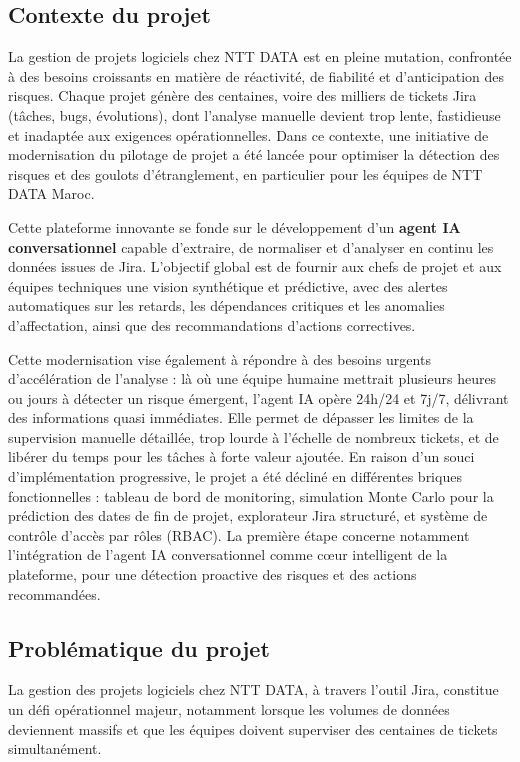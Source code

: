 \subsection{Contexte du projet}

La gestion de projets logiciels chez NTT DATA est en pleine mutation, confrontée à des besoins croissants en matière de réactivité, de fiabilité et d’anticipation des risques. Chaque projet génère des centaines, voire des milliers de tickets Jira (tâches, bugs, évolutions), dont l’analyse manuelle devient trop lente, fastidieuse et inadaptée aux exigences opérationnelles. Dans ce contexte, une initiative de modernisation du pilotage de projet a été lancée pour optimiser la détection des risques et des goulots d’étranglement, en particulier pour les équipes de NTT DATA Maroc.

Cette plateforme innovante se fonde sur le développement d’un \textbf{agent IA conversationnel} capable d’extraire, de normaliser et d’analyser en continu les données issues de Jira. L’objectif global est de fournir aux chefs de projet et aux équipes techniques une vision synthétique et prédictive, avec des alertes automatiques sur les retards, les dépendances critiques et les anomalies d’affectation, ainsi que des recommandations d’actions correctives.

Cette modernisation vise également à répondre à des besoins urgents d’accélération de l’analyse : là où une équipe humaine mettrait plusieurs heures ou jours à détecter un risque émergent, l’agent IA opère 24h/24 et 7j/7, délivrant des informations quasi immédiates. Elle permet de dépasser les limites de la supervision manuelle détaillée, trop lourde à l’échelle de nombreux tickets, et de libérer du temps pour les tâches à forte valeur ajoutée. En raison d’un souci d’implémentation progressive, le projet a été décliné en différentes briques fonctionnelles : tableau de bord de monitoring, simulation Monte Carlo pour la prédiction des dates de fin de projet, explorateur Jira structuré, et système de contrôle d’accès par rôles (RBAC). La première étape concerne notamment l’intégration de l’agent IA conversationnel comme cœur intelligent de la plateforme, pour une détection proactive des risques et des actions recommandées.

\subsection{Problématique du projet}

La gestion des projets logiciels chez NTT DATA, à travers l’outil Jira, constitue un défi opérationnel majeur, notamment lorsque les volumes de données deviennent massifs et que les équipes doivent superviser des centaines de tickets simultanément.

